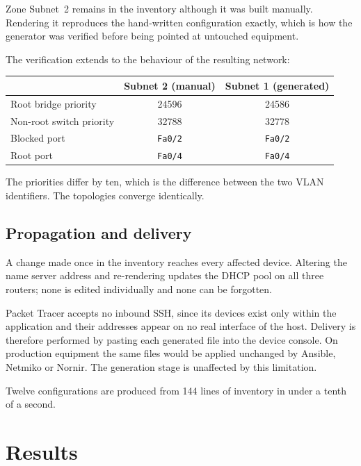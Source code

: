 \documentclass[12pt,a4paper]{article}
\begin{document}
Zone Subnet~2 remains in the inventory although it was built manually. Rendering
it reproduces the hand-written configuration exactly, which is how the generator
was verified before being pointed at untouched equipment.

The verification extends to the behaviour of the resulting network:

\begin{table}[H]
\centering
\begin{tabular}{@{} l c c @{}}
\toprule
 & \textbf{Subnet 2 (manual)} & \textbf{Subnet 1 (generated)} \\
\midrule
Root bridge priority     & 24596 & 24586 \\
Non-root switch priority & 32788 & 32778 \\
Blocked port             & \texttt{Fa0/2} & \texttt{Fa0/2} \\
Root port                & \texttt{Fa0/4} & \texttt{Fa0/4} \\
\bottomrule
\end{tabular}
\end{table}

The priorities differ by ten, which is the difference between the two VLAN
identifiers. The topologies converge identically.

\subsection{Propagation and delivery}

A change made once in the inventory reaches every affected device. Altering the
name server address and re-rendering updates the DHCP pool on all three routers;
none is edited individually and none can be forgotten.

Packet Tracer accepts no inbound SSH, since its devices exist only within the
application and their addresses appear on no real interface of the host.
Delivery is therefore performed by pasting each generated file into the device
console. On production equipment the same files would be applied unchanged by
Ansible, Netmiko or Nornir. The generation stage is unaffected by this
limitation.

Twelve configurations are produced from 144 lines of inventory in under a tenth
of a second.

\newpage
\section{Results}
\end{document}
